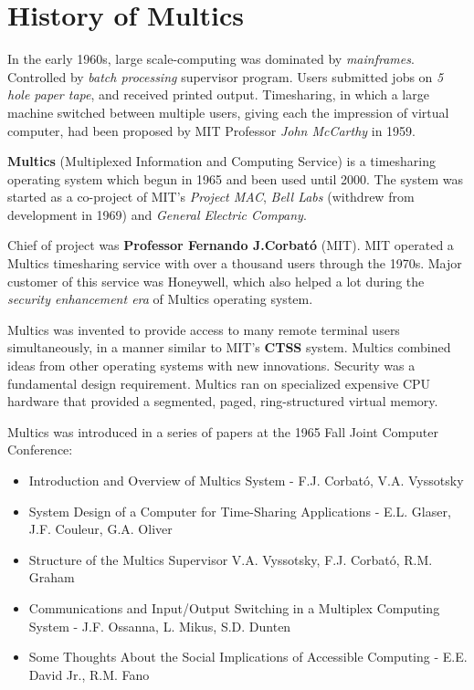 


\section{History of Multics}

In the early 1960s, large scale-computing was dominated by \textit{mainframes}. Controlled by \textit{batch processing} 
supervisor program. Users submitted jobs on \textit{5 hole paper tape}, and received printed output.
Timesharing, in which a large machine switched between multiple users, giving each the impression of virtual computer, 
had been proposed by MIT Professor \textit{John McCarthy} in 1959.

\textbf{Multics} (Multiplexed Information and Computing Service) is a timesharing operating system which begun in 1965 and been 
used until 2000. The system was started as a co-project of MIT's \textit{Project MAC}, \textit{Bell Labs} (withdrew from development 
 in 1969) and \textit{General Electric Company}.

Chief of project was \textbf{Professor Fernando J.Corbató} (MIT). MIT operated a Multics timesharing service with over a thousand users 
through the 1970s. Major customer of this service was Honeywell, which also helped a lot during the \textit{security enhancement era} 
of Multics operating system.

Multics was invented to provide access to many remote terminal users simultaneously, in a manner similar to MIT's \textbf{CTSS} 
system. Multics combined ideas from other operating systems with new innovations. Security was a fundamental design requirement.
Multics ran on specialized expensive CPU hardware that provided a segmented, paged, ring-structured virtual memory. 

Multics was introduced in a series of papers at the 1965 Fall Joint Computer Conference:

\begin{itemize}
    \item Introduction and Overview of Multics System - F.J. Corbató, V.A. Vyssotsky
    \item System Design of a Computer for Time-Sharing Applications - E.L. Glaser, J.F. Couleur, G.A. Oliver
    \item Structure of the Multics Supervisor V.A. Vyssotsky, F.J. Corbató, R.M. Graham
    \item Communications and Input/Output Switching in a Multiplex Computing System -  J.F. Ossanna, L. Mikus, S.D. Dunten
    \item Some Thoughts About the Social Implications of Accessible Computing - E.E. David Jr., R.M. Fano
\end{itemize}


